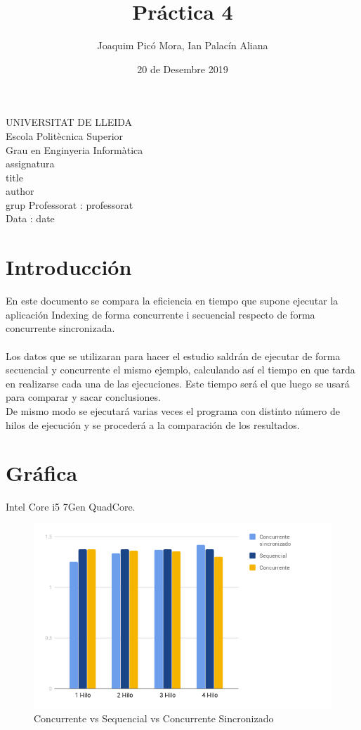 \documentclass{article}
\title{Práctica 4}
\author{Joaquim Picó Mora, Ian Palacín Aliana}
\date{20 de Desembre 2019}
\renewcommand{\maketitle}{ %
	\begin{titlepage}
		\raggedright{UNIVERSITAT DE LLEIDA \\
			Escola Politècnica Superior \\
			Grau en Enginyeria Informàtica\\
			\1assignatura\\}
		\vspace{5cm}
		\centering\huge{\5title \\}
		\vspace{3cm}
		\large{\6author} \\
		\normalsize{\3grup}
		\vfill
		Professorat : \4professorat \\
		Data : \7date
\end{titlepage}}
\begin{document}
	\maketitle
	\thispagestyle{empty}
	
	\newpage
	\tableofcontents
	\newpage
	




\section{Introducción}

En este documento se compara la eficiencia en tiempo que supone ejecutar la aplicación Indexing de forma concurrente i secuencial respecto de forma concurrente sincronizada.
\\\\
Los datos que se utilizaran para hacer el estudio saldrán de ejecutar de forma secuencial y concurrente el mismo ejemplo, calculando así el tiempo en que tarda en realizarse cada una de las ejecuciones. Este tiempo será el que luego se usará para comparar y sacar conclusiones.\\
De mismo modo se ejecutará varias veces el programa con distinto número de hilos de ejecución y se procederá a la comparación de los resultados.

\section{Gráfica}
Intel Core i5 7Gen QuadCore.
\begin{figure}[hbt!]
  \includegraphics[width=\linewidth]{chart.png}
  \caption{Concurrente vs Sequencial vs Concurrente Sincronizado}
  \label{fig:convsseq}
\end{figure}
\newpage
\end{document}
